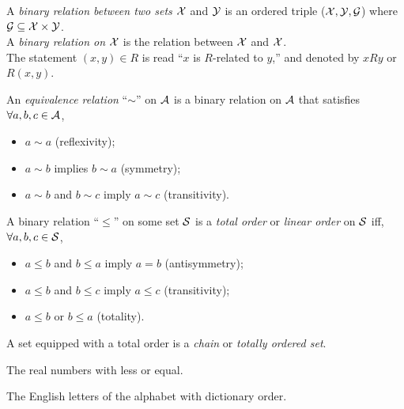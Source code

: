  \begin{defn}
   A \emph{binary relation between two sets} ${\cal X}$ and ${\cal Y}$
    is an ordered triple
    (${\cal X}, {\cal Y}, {\cal G}$)
    where ${\cal G}\subseteq{\cal X}\times{\cal Y}$.\\
  A \emph{binary relation on} ${\cal X}$
    is the relation between ${\cal X}$ and ${\cal X}$.\\
  The statement $(x,y)\in R$ is read
   ``$x$ is $R$-related to $y$,'' and
   denoted by $xRy$ or $R(x,y)$.
 \end{defn}

  \begin{defn}
   \label{defn:equivalenceRelation}
    An \emph{equivalence relation} ``$\sim$'' on ${\cal A}$ is 
    a binary relation on ${\cal A}$ 
    that satisfies
    $\forall a,b,c\in{\cal A}$,
    \begin{itemize}
      \itemsep0em
    \item $a\sim a$ (reflexivity);
    \item $a\sim b$ implies $b\sim a$ (symmetry);
    \item $a\sim b$ and $b\sim c$ imply $a\sim c$ (transitivity).
    \end{itemize}
  \end{defn}

 \begin{defn}
   \label{defn:totalOrder}
   A binary relation ``$\le$'' on some set ${\cal S}$
    is a \emph{total order} or \emph{linear order} on ${\cal S}$
    iff,
    $\forall a,b,c\in{\cal S}$,
    \begin{itemize}
    \item $a\le b$ and $b\le a$ imply $a=b$ (antisymmetry);
    \item $a\le b$ and $b\le c$ imply $a\le c$ (transitivity);
    \item $a\le b$ or $b\le a$ (totality).
    \end{itemize}
   A set equipped with a total order
    is a \emph{chain} or \emph{totally ordered set}.
 \end{defn}

 \begin{exm}
   The real numbers with less or equal.
 \end{exm}

 \begin{exm}
   The English letters of the alphabet with dictionary order.
 \end{exm}

